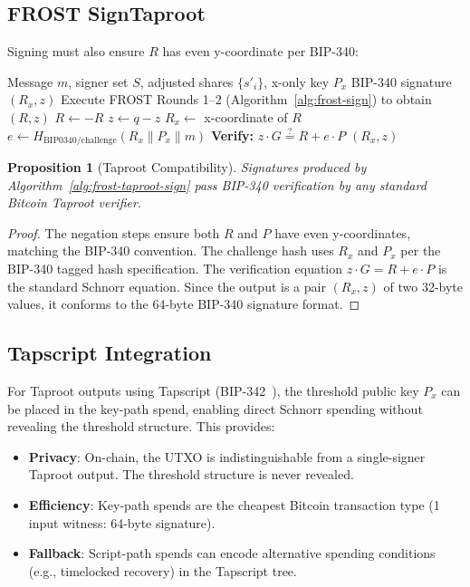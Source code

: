 \documentclass[11pt,twocolumn]{article}
\newtheorem{proposition}[theorem]{Proposition}
\begin{document}
\subsection{FROST SignTaproot}

Signing must also ensure $R$ has even y-coordinate per BIP-340:

\begin{algorithm}[H]
\caption{FROST SignTaproot}
\label{alg:frost-taproot-sign}
\begin{algorithmic}[1]
\Require Message $m$, signer set $S$, adjusted shares $\{s'_i\}$, x-only key $P_x$
\Ensure BIP-340 signature $(R_x, z)$
\State Execute FROST Rounds 1--2 (Algorithm~\ref{alg:frost-sign}) to obtain $(R, z)$
  \State $R \gets -R$
  \State $z \gets q - z$ 
\EndIf
\State $R_x \gets$ x-coordinate of $R$
\State $e \gets H_{\text{BIP0340/challenge}}(R_x \| P_x \| m)$
\State \textbf{Verify:} $z \cdot G \stackrel{?}{=} R + e \cdot P$
\State \Return $(R_x, z)$ 
\end{algorithmic}
\end{algorithm}

\begin{proposition}[Taproot Compatibility]
\label{prop:taproot}
Signatures produced by Algorithm~\ref{alg:frost-taproot-sign} pass BIP-340 verification
by any standard Bitcoin Taproot verifier.
\end{proposition}

\begin{proof}
The negation steps ensure both $R$ and $P$ have even y-coordinates, matching the
BIP-340 convention. The challenge hash uses $R_x$ and $P_x$ per the BIP-340 tagged
hash specification. The verification equation $z \cdot G = R + e \cdot P$ is the
standard Schnorr equation. Since the output is a pair $(R_x, z)$ of two 32-byte
values, it conforms to the 64-byte BIP-340 signature format.
\end{proof}

\subsection{Tapscript Integration}

For Taproot outputs using Tapscript (BIP-342~\cite{bip342}), the threshold public key
$P_x$ can be placed in the key-path spend, enabling direct Schnorr spending without
revealing the threshold structure. This provides:

\begin{itemize}[nosep]
  \item \textbf{Privacy}: On-chain, the UTXO is indistinguishable from a single-signer
    Taproot output. The threshold structure is never revealed.
  \item \textbf{Efficiency}: Key-path spends are the cheapest Bitcoin transaction type
    (1 input witness: 64-byte signature).
  \item \textbf{Fallback}: Script-path spends can encode alternative spending conditions
    (e.g., timelocked recovery) in the Tapscript tree.
\end{itemize}
\end{document}
